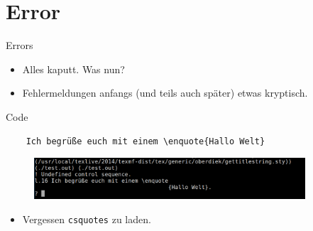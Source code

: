 \section{Error}
\begin{frame}[fragile]{Errors}
  \begin{itemize}
    \item Alles kaputt. Was nun?
    \item Fehlermeldungen anfangs (und teils auch später) etwas kryptisch.
  \end{itemize}
  \begin{block}{Code}
    \begin{lstlisting}
    Ich begrüße euch mit einem \enquote{Hallo Welt}
    \end{lstlisting}
  \end{block}
  \begin{figure}
  \centering
  \includegraphics[width=0.9\textwidth]{figures/error1.png}
  \end{figure}
  \huge
  \begin{itemize}
    \item<2->[$\Rightarrow$] Vergessen \texttt{csquotes} zu laden.
  \end{itemize}
\end{frame}


